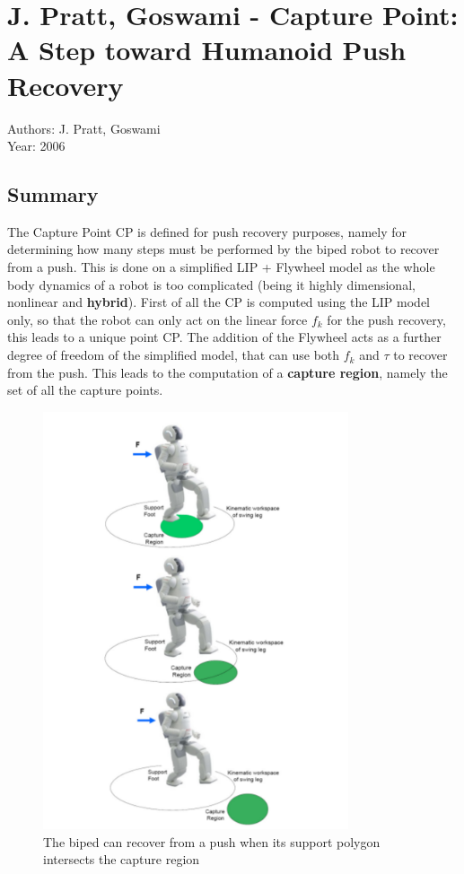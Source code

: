 \section{J. Pratt, Goswami - Capture Point: A Step toward Humanoid Push Recovery \cite{Pratt+CDG:2006}}
Authors: J. Pratt, Goswami\\
Year: 2006
\subsection*{Summary}
The Capture Point CP is defined for push recovery purposes, namely for determining how many steps must be performed by the biped robot to recover from a push. This is done on a simplified LIP +  Flywheel model as the whole body dynamics of a robot is too complicated (being it highly dimensional, nonlinear and \textbf{hybrid}). First of all the CP is computed using the LIP model only, so that the robot can only act on the linear force $f_k$ for the push recovery, this leads to a unique point CP. The addition of the Flywheel acts as a further degree of freedom of the simplified model, that can use both $f_k$ and $\tau$ to recover from the push. This leads to the computation of a \textbf{capture region}, namely the set of all the capture points.
\begin{figure}[h!]
  \centering
  \includegraphics[width=90mm]{CapturePoint}
  \caption{The biped can recover from a push when its support polygon intersects the capture region}
\end{figure}

